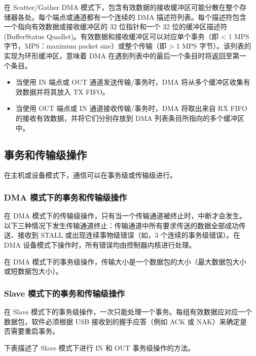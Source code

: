 \documentclass[main\_\_CN.tex]{subfiles}
\begin{document}
在 Scatter/Gather DMA 模式下，包含有效数据的接收缓冲区可能分散在整个存储器各处。每个端点或通道都有一个连续的 DMA 描述符列表。每个描述符包含一个指向有效数据或接收缓冲区的 32 位指针和一个 32 位的缓冲区描述符 (BufferStatus Quadlet)。有效数据和接收缓冲区可以对应单个事务（即 < 1 MPS 字节，MPS：maximum packet size）或整个传输（即 > 1 MPS 字节）。该列表的实现为环形缓冲区，意味着 DMA 在遇到列表中的最后一个条目时将返回至第一个条目。

\begin{itemize}
\item 当使用 IN 端点或 OUT 通道发送传输/事务时，DMA 将从多个缓冲区收集有效数据并将其放入 TX FIFO。
\item 当使用 OUT 端点或 IN 通道接收传输/事务时，DMA 将取出来自 RX FIFO 的接收有效数据，并将它们分别存放到 DMA 列表条目所指向的多个缓冲区中。
\end{itemize}

\subsection{事务和传输级操作}

在主机或设备模式下，通信可以在事务级或传输级进行。

\subsubsection{DMA 模式下的事务和传输级操作}

在 DMA 模式下的传输级操作，只有当一个传输通道被终止时，中断才会发生。以下三种情况下发生传输通道终止：传输通道中所有要求传送的数据全部成功传送、接收到 STALL 或出现连续事物级错误（如，3 个连续的事务级错误）。在 DMA 设备模式下操作时，所有错误均由控制器内核进行处理。

在 DMA 模式下的事务级操作，传输大小是一个数据包的大小（最大数据包大小或短数据包大小）。

\subsubsection{ Slave 模式下的事务和传输级操作}

在 Slave 模式下的事务级操作，一次只能处理一个事务。每组有效数据应对应一个数据包，软件必须根据 USB 接收到的握手应答（例如 ACK 或 NAK）来确定是否需要重启事务。

下表描述了 Slave 模式下进行 IN 和 OUT 事务级操作的方法。

\clearpage

\end{document}
